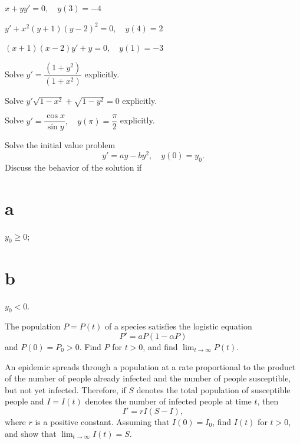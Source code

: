 \begin{exerciselist}

\item\label{exer:2.2.21}$x+yy'=0, \quad y(3) =-4$

\item\label{exer:2.2.22}$y'+x^2(y+1)(y-2)^2=0, \quad y(4)=2$

\item\label{exer:2.2.23}$(x+1)(x-2)y'+y=0, \quad y(1)=-3$

\item\label{exer:2.2.24}Solve $y'=\dfrac{(1+y^2)}{(1+x^2)}$ explicitly.

\item\label{exer:2.2.25}Solve $y'\sqrt{1-x^2}+\sqrt{1-y^2}=0$ explicitly.

\item\label{exer:2.2.26}Solve $y'=\dfrac{\cos x}{\sin y},\quad y (\pi)=\dfrac{\pi}{2}$
explicitly. 

\item\label{exer:2.2.27}Solve the initial value problem
\[
y'=ay-by^2,\quad y(0)=y_0.
\]
Discuss the behavior  of the solution if
\part{a} $y_0\ge0$; \part{b} $y_0<0$.

\item\label{exer:2.2.28}The population $P=P(t)$ of a  species satisfies
the logistic equation
\[
P'=aP(1-\alpha P)
\]
 and  $P(0)=P_0>0$.  Find $P$  for $t>0$, and  find
$\lim_{t\to\infty}P(t)$.



\item\label{exer:2.2.29}An epidemic spreads through a population at a rate
proportional to the product of the number of people already infected
and the number of people susceptible, but not yet infected. Therefore,
 if $S$ denotes the total population of susceptible people and
$I=I(t)$ denotes the number of infected people at time $t$, then
\[
I'=rI(S-I),
\]
where $r$ is a positive constant. Assuming that $I(0)=I_0$,
find $I(t)$ for $t>0$, and show that
$\lim_{t\to\infty}I(t)=S$.


\end{exerciselist}
